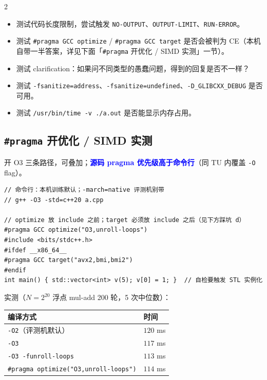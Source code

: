 \begin{multicols*}{2}
	\begin{itemize}
		\item 测试代码长度限制，尝试触发 \texttt{NO-OUTPUT}、\texttt{OUTPUT-LIMIT}、\texttt{RUN-ERROR}。
		\item 测试 \verb|#pragma GCC optimize| / \verb|#pragma GCC target| 是否会被判为 CE（本机自带一半答案，详见下面「\texttt{\#pragma} 开优化 / SIMD 实测」一节）。
		\item 测试 clarification：如果问不同类型的愚蠢问题，得到的回复是否不一样？
		\item 测试 \verb|-fsanitize=address|、\verb|-fsanitize=undefined|、\verb|-D_GLIBCXX_DEBUG| 是否可用。
		\item 测试 \verb|/usr/bin/time -v ./a.out| 是否能显示内存占用。
	\end{itemize}

	\subsection{\texttt{\#pragma} 开优化 / SIMD 实测}

	开 O3 三条路径，可叠加；\textcolor{blue}{\textbf{源码 pragma 优先级高于命令行}}（同 TU 内覆盖 \texttt{-O} flag）。

	\begin{verbatim}
// 命令行：本机训练默认；-march=native 评测机别带
// g++ -O3 -std=c++20 a.cpp

// optimize 放 include 之前；target 必须放 include 之后（见下方踩坑 d）
#pragma GCC optimize("O3,unroll-loops")
#include <bits/stdc++.h>
#ifdef __x86_64__
#pragma GCC target("avx2,bmi,bmi2")
#endif
int main() { std::vector<int> v(5); v[0] = 1; }  // 自检要触发 STL 实例化
	\end{verbatim}

	实测（$N = 2^{20}$ 浮点 mul-add 200 轮，5 次中位数）：

	\begin{center}
		\small
		\begin{tabular}{l|l}
			\hline
			编译方式                                 & 时间      \\
			\hline
			\texttt{-O2}（评测机默认）               & $120$ ms  \\
			\texttt{-O3}                              & $117$ ms  \\
			\texttt{-O3 -funroll-loops}               & $113$ ms  \\
			\texttt{\#pragma optimize("O3,unroll-loops")} & $114$ ms  \\
			\hline
		\end{tabular}
	\end{center}


\end{multicols*}
